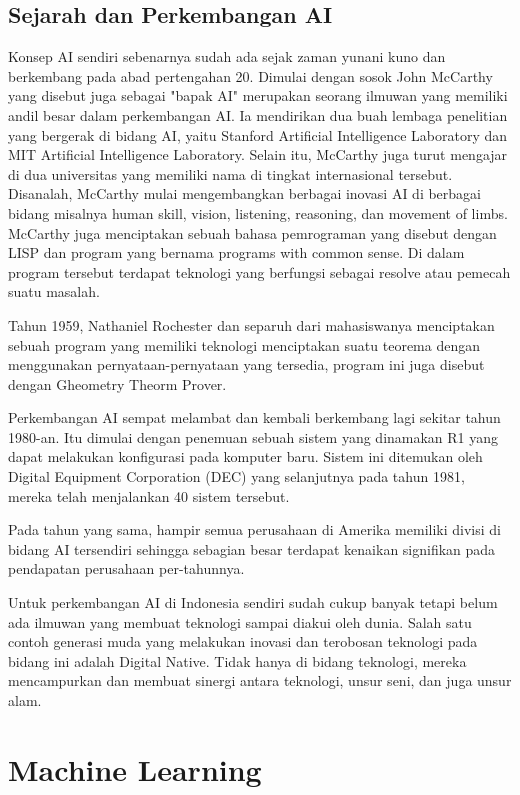 \subsection{Sejarah dan Perkembangan AI}
\par
Konsep AI sendiri sebenarnya sudah ada sejak zaman yunani kuno dan berkembang pada abad pertengahan 20. Dimulai dengan sosok John McCarthy yang disebut juga sebagai "bapak AI" merupakan seorang ilmuwan yang memiliki andil besar dalam perkembangan AI. Ia mendirikan dua buah lembaga penelitian yang bergerak di bidang AI, yaitu Stanford Artificial Intelligence Laboratory dan MIT Artificial Intelligence Laboratory. Selain itu, McCarthy juga turut mengajar di dua universitas yang memiliki nama di tingkat internasional tersebut. Disanalah, McCarthy mulai mengembangkan berbagai inovasi AI di berbagai bidang misalnya human skill, vision, listening, reasoning, dan movement of limbs. McCarthy juga menciptakan sebuah bahasa pemrograman yang disebut dengan LISP dan program yang bernama programs with common sense. Di dalam program tersebut terdapat teknologi yang berfungsi sebagai resolve atau pemecah suatu masalah.  
\par
Tahun 1959, Nathaniel Rochester dan separuh dari mahasiswanya menciptakan sebuah program yang memiliki teknologi menciptakan suatu teorema dengan menggunakan pernyataan-pernyataan yang tersedia, program ini juga disebut dengan Gheometry Theorm Prover.
\par
Perkembangan AI sempat melambat dan kembali berkembang lagi sekitar tahun 1980-an. Itu dimulai dengan penemuan sebuah sistem yang dinamakan R1 yang dapat melakukan konfigurasi pada komputer baru. Sistem ini ditemukan oleh Digital Equipment Corporation (DEC) yang selanjutnya pada tahun 1981, mereka telah menjalankan 40 sistem tersebut.
\par
Pada tahun yang sama, hampir semua perusahaan di Amerika memiliki divisi di bidang AI tersendiri sehingga sebagian besar terdapat kenaikan signifikan pada pendapatan perusahaan per-tahunnya.
\par
Untuk perkembangan AI di Indonesia sendiri sudah cukup banyak tetapi belum ada ilmuwan yang membuat teknologi sampai diakui oleh dunia. Salah satu contoh generasi muda yang melakukan inovasi dan terobosan teknologi pada bidang ini adalah Digital Native. Tidak hanya di bidang teknologi, mereka mencampurkan dan membuat sinergi antara teknologi, unsur seni, dan juga unsur alam.

\section{Machine Learning}
